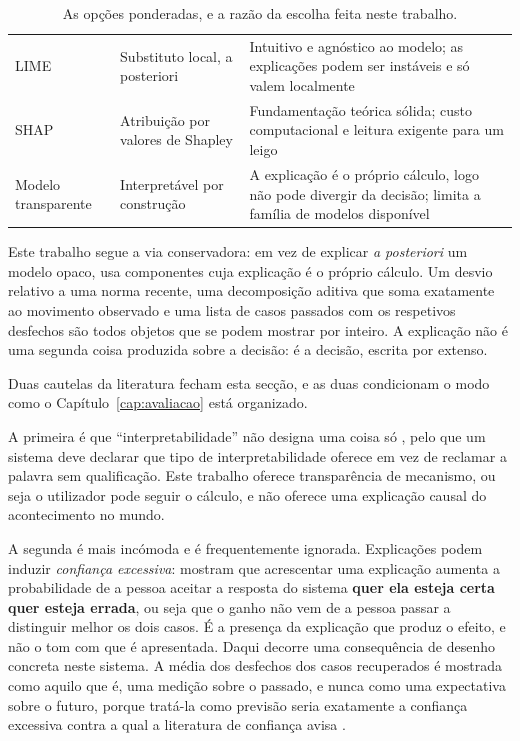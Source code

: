 \begin{table}[ht]
\caption[Abordagens de explicabilidade consideradas]{As opções ponderadas, e a razão da escolha feita
neste trabalho.}
\label{tab:ctx_xai}
\centering
\small
\begin{tabular}{L{0.20\textwidth} L{0.24\textwidth} L{0.42\textwidth}}
\toprule
{} &  &  \\
\midrule
LIME \autocite{ribeiro2016lime}
  & Substituto local, a posteriori
  & Intuitivo e agnóstico ao modelo; as explicações podem ser instáveis e só valem localmente \\
\addlinespace
SHAP \autocite{lundberg2017shap}
  & Atribuição por valores de Shapley
  & Fundamentação teórica sólida; custo computacional e leitura exigente para um leigo \\
\addlinespace
Modelo transparente \newline \autocite{rudin2019stop}
  & Interpretável por construção
  & A explicação é o próprio cálculo, logo não pode divergir da decisão; limita a família de modelos disponível \\
\bottomrule
\end{tabular}
\end{table}

Este trabalho segue a via conservadora: em vez de explicar \emph{a posteriori} um modelo opaco, usa
componentes cuja explicação é o próprio cálculo. Um desvio relativo a uma norma recente, uma
decomposição aditiva que soma exatamente ao movimento observado e uma lista de casos passados com os
respetivos desfechos são todos objetos que se podem mostrar por inteiro. A explicação não é uma
segunda coisa produzida sobre a decisão: é a decisão, escrita por extenso.

Duas cautelas da literatura fecham esta secção, e as duas condicionam o modo como o
Capítulo~\ref{cap:avaliacao} está organizado.

A primeira é que ``interpretabilidade'' não designa uma coisa só \autocite{lipton2018mythos}, pelo
que um sistema deve declarar que tipo de interpretabilidade oferece em vez de reclamar a palavra sem
qualificação. Este trabalho oferece transparência de mecanismo, ou seja o utilizador pode seguir o
cálculo, e não oferece uma explicação causal do acontecimento no mundo.

A segunda é mais incómoda e é frequentemente ignorada. Explicações podem induzir
\emph{confiança excessiva}: \textcite{bansal2021whole} mostram que acrescentar uma explicação
aumenta a probabilidade de a pessoa aceitar a resposta do sistema \textbf{quer ela esteja certa quer
esteja errada}, ou seja que o ganho não vem de a pessoa passar a distinguir melhor os dois casos. É
a presença da explicação que produz o efeito, e não o tom com que é apresentada. Daqui decorre uma
consequência de desenho concreta neste sistema. A média dos desfechos dos casos recuperados é
mostrada como aquilo que é, uma medição sobre o passado, e nunca como uma expectativa sobre o futuro,
porque tratá-la como previsão seria exatamente a confiança excessiva contra a qual a literatura de
confiança avisa \autocite{lee2004trust, bansal2021whole}.

